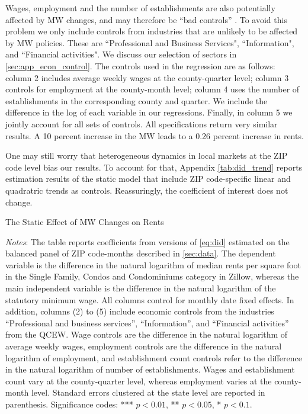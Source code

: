 Wages, employment and the number of establishments are also potentially affected by MW changes,
and may therefore be ``bad controls'' \parencite{AngristPischke2009}. To avoid this problem we 
only include controls from industries that are unlikely to be affected by MW policies. These 
are ``Professional and Business Services", ``Information", and ``Financial activities". We 
discuss our selection of sectors in \autoref{sec:app_econ_control}. The controls used in the 
regression are as follows: column 2 includes average weekly wages at the county-quarter level; 
column 3 controls for employment at the county-month level; column 4 uses the number of 
establishments in the corresponding county and quarter. We include the difference in the log of 
each variable in our regressions. Finally, in column 5 we jointly account for all sets of 
controls. All specifications return very similar results. A 10 percent increase in the MW leads 
to a 0.26 percent increase in rents. 

One may still worry that heterogeneous dynamics in local markets at the ZIP code level bias our 
results. To account for that, Appendix \autoref{tab:did_trend} reports estimation results of the 
static model that include ZIP code-specific linear and quadratric trends as controls. 
Reassuringly, the coefficient of interest does not change.

\begin{table}[h!]
    \caption{The Static Effect of MW Changes on Rents}
    \label{tab:static_model}
    \centering
    
    \begin{minipage}{0.95\textwidth} \footnotesize
		\vspace{3mm} 
		\textit{Notes}: The table reports coefficients from versions of \autoref{eq:did} 
		estimated on the balanced panel of ZIP code-months described in \autoref{sec:data}. 
		The dependent variable is the difference in the natural logarithm of median	rents 
		per square foot in the Single Family, Condos and Condominiums category in Zillow, 
		whereas the main independent variable is the difference in the natural logarithm of 
		the statutory minimum wage. All columns control for monthly date fixed effects. In 
		addition, columns (2) to (5) include economic controls from the industries 
		``Professional and business services'', ``Information'', and ``Financial activities'' 
		from the QCEW. Wage controls are the difference in the natural logarithm of average 
		weekly wages, employment controls are the difference in the natural logarithm of 
		employment, and establishment count controls refer to the difference in the natural 
		logarithm of number of establishments. Wages and establishment count vary at the 
		county-quarter level, whereas employment varies at the county-month level. 
		Standard errors clustered at the state level are reported in parenthesis. Significance 
		codes: *** $p < 0.01$, ** $p < 0.05$, * $p < 0.1$.
	\end{minipage}
\end{table}

